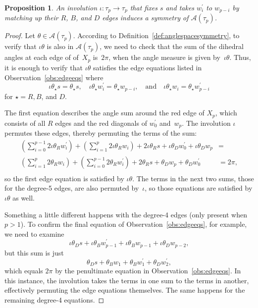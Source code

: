 \documentclass[reqno]{amsart}
\theoremstyle{plain}
\newtheorem{prop}[thm]{Proposition}
\theoremstyle{definition}
\begin{document}
\begin{prop} \label{prop:symmetry}
An involution $\iota:\tau_{p}\rightarrow\tau_{p}$ that fixes $s$ and takes $w_i^\prime$ to $w_{p-i}$ by matching up their $R$, $B$, and $D$ edges induces a symmetry of $\mathcal A(\tau_{p})$.
\end{prop}

\begin{proof}
Let $\theta\in\mathcal A(\tau_{p})$.  According to Definition~\ref{def:anglespacesymmetry}, to verify that $\iota\theta$ is also in $\mathcal A(\tau_{p})$, we need to check that the sum of the dihedral angles at each edge of of~$X_{p}$ is~$2\pi$, when the angle measure is given by~$\iota\theta$.  Thus, it is enough to verify that $\iota\theta$ satisfies the edge equations listed in Observation~\ref{obs:edgeeqs} where
$$
\iota\theta_\star s=\theta_\star s, \quad
\iota\theta_\star w_i^\prime=\theta_\star w_{p-i},\quad \text{and}\quad 
\iota\theta_\star w_i=\theta_\star w_{p-i}^\prime
$$
for $\star=R, B$, and $D$.

The first equation describes the angle sum around the red edge of $X_{p}$, which consists of all $R$ edges and the red diagonals of $w_0^\prime$ and~$w_p$.  The involution $\iota$ permutes these edges, thereby permuting the terms of the sum:
\begin{align*}
\left(\sum_{i=0}^{p-1} 2\iota\theta_R w_i^\prime\right) +\left(\sum_{i=1}^{p} 2\iota\theta_R w_i\right) +2\iota\theta_R s + \iota\theta_Dw_0^\prime+\iota\theta_Dw_p&=\\
\left(\sum_{i=1}^{p} 2\theta_R w_i\right) +\left(\sum_{i=0}^{p-1} 2\theta_R w_i^\prime\right) +2\theta_R s + \theta_Dw_p+\theta_Dw_0^\prime&=2\pi,\\
\end{align*}
so the first edge equation is satisfied by $\iota\theta$.  The terms in the next two sums, those for the degree-5 edges, are also permuted by~$\iota$, so those equations are satisfied by $\iota\theta$ as well.  

Something a little different happens with the degree-4 edges (only present when $p>1$).  To confirm the final equation of Observation~\ref{obs:edgeeqs}, for example, we need to examine
$$
\iota\theta_D s+\iota\theta_B w_{p-1}^\prime+\iota\theta_B w_{p-1}+\iota\theta_Dw_{p-2},
$$
but this sum is just
$$
\theta_D s+\theta_B w_1+\theta_B w_1^\prime+\theta_D  w_2^\prime,
$$
which equals $2\pi$ by the penultimate equation in Observation~\ref{obs:edgeeqs}.  In this instance, the involution takes the terms in one sum to the terms in another, effectively permuting the edge equations themselves.  The same happens for the remaining degree-4 equations.  
\end{proof}
\end{document}
